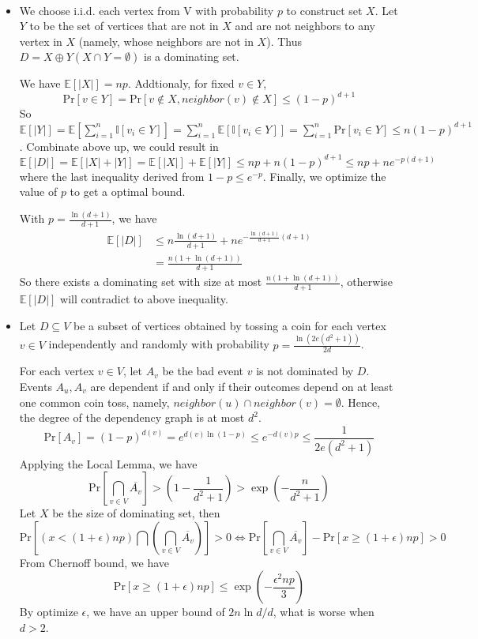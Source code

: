 \documentclass[12pt]{article}
\newenvironment{solution}[2][Solution]{\begin{trivlist}
\item[\hskip \labelsep {\bfseries #1}\hskip \labelsep {\bfseries #2.}]}{\end{trivlist}}
\begin{document}
\begin{solution}{2}
    ~

    \begin{itemize}
        \item We choose i.i.d. each vertex from V with probability $p$ to construct set $X$. Let $Y$ to be the 
        set of vertices that are not in $X$ and are not neighbors to any vertex in $X$ (namely, whose neighbors are not in $X$). 
        Thus $D=X \oplus Y (X \cap Y = \emptyset)$ is a dominating set.

        We have $\mathbb{E}[|X|]=np$. Addtionaly, for fixed $v \in Y$,
        \[\mathrm{Pr}[v \in Y] = \mathrm{Pr}[v \not \in X, neighbor(v) \not \in X]\le (1-p)^{d+1}\]
        So $\mathbb{E}[|Y|] = \mathbb{E}[\sum_{i=1}^n \mathbb{I}[v_i \in Y]]= \sum_{i=1}^n\mathbb{E}[ \mathbb{I}[v_i \in Y]]
        =\sum_{i=1}^n\mathrm{Pr}[v_i \in Y] \le n(1-p)^{d+1}$. Combinate above up, we could result in
        \[\mathbb{E}[|D|] = \mathbb{E}[|X|+|Y|] = \mathbb{E}[|X|] + \mathbb{E}[|Y|] \le np + n(1-p)^{d+1} \le np + ne^{-p(d+1)}\]
        where the last inequality derived from $1-p \le e^{-p}$. Finally, we optimize the value of $p$ to get a optimal bound.
        
        With $p=\frac{\ln (d+1)}{d+1}$, we have
        \begin{align*}
            \mathbb{E}[|D|] & \le n\frac{\ln (d+1)}{d+1} + ne^{-\frac{\ln (d+1)}{d+1}(d+1)} \\
            & = \frac{n(1+\ln (d+1))}{d+1}
        \end{align*}
        So there exists a dominating set with size at most $\frac{n(1+\ln (d+1))}{d+1}$, otherwise $\mathbb{E}[|D|]$ will contradict
        to above inequality.

        \item Let $D \subseteq V$ be a subset of vertices obtained by tossing a coin for each vertex $v \in V$ independently and randomly with
        probability $p = \frac{\ln(2e(d^2+1))}{2d}$. 

        For each vertex $v \in V$, let $A_v$ be the bad event $v$ is not dominated by $D$. Events $A_u, A_v$ are dependent if and only
        if their outcomes depend on at least one common coin toss, namely, $neighbor(u) \cap neighbor(v) = \emptyset$. Hence, the degree of
        the dependency graph is at most $d^2$.
        \[\mathrm{Pr}[A_v]=(1-p)^{d(v)} = e^{d(v)\ln (1-p)} \le e^{-d(v)p}\le \frac{1}{2e(d^2+1)}\]
        Applying the Local Lemma, we have
        \[\mathrm{Pr}[\bigcap_{v\in V}\overline{A_v}] > (1-\frac{1}{d^2+1}) > \exp(-\frac{n}{d^2+1})\]
        Let $X$ be the size of dominating set, then
        \[\mathrm{Pr}[(x < (1+\epsilon)np) \bigcap (\bigcap_{v\in V}\overline{A_v})]> 0 \Leftrightarrow \mathrm{Pr}[\bigcap_{v\in V}\overline{A_v}] - \mathrm{Pr}[x \ge (1+\epsilon)np] > 0\]
        From Chernoff bound, we have
        \[\mathrm{Pr}[x \ge (1+\epsilon)np] \le \exp(-\frac{\epsilon^2np}{3})\]
        By optimize $\epsilon$, we have an upper bound of $2n\ln d /d$, what is worse when $d > 2$.
    \end{itemize}
\end{solution}
\end{document}
